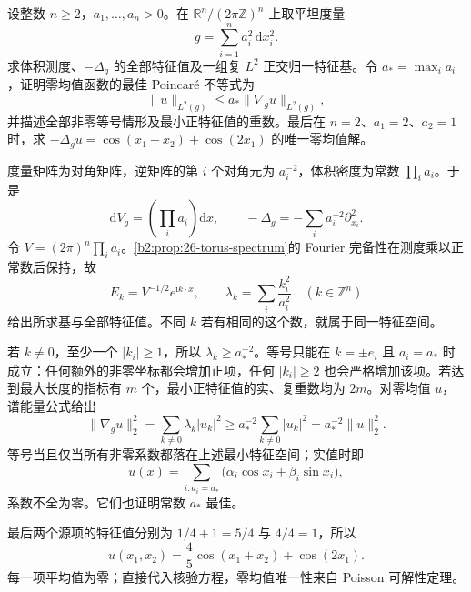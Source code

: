\begin{exercise}\label{b2:ex:26-rectangular-torus}
设整数 \(n\geq2\)，\(a_1,\ldots,a_n>0\)。在 \(\mathbb R^n/(2\pi\mathbb Z)^n\) 上取平坦度量
\[
 g=\sum_{i=1}^n a_i^2\,\mathrm dx_i^2.
\]
求体积测度、\(-\Delta_g\) 的全部特征值及一组复 \(L^2\) 正交归一特征基。令 \(a_*=\max_i a_i\)，证明零均值函数的最佳 Poincaré 不等式为
\[
 \|u\|_{L^2(g)}\leq a_*\|\nabla_g u\|_{L^2(g)},
\]
并描述全部非零等号情形及最小正特征值的重数。最后在 \(n=2\)、\(a_1=2\)、\(a_2=1\) 时，求 \(-\Delta_gu=\cos(x_1+x_2)+\cos(2x_1)\) 的唯一零均值解。
\end{exercise}
\begin{solution}
度量矩阵为对角矩阵，逆矩阵的第 \(i\) 个对角元为 \(a_i^{-2}\)，体积密度为常数 \(\prod_i a_i\)。于是
\[
 \mathrm dV_g=\left(\prod_i a_i\right)\mathrm dx,\qquad
 -\Delta_g=-\sum_i a_i^{-2}\partial_{x_i}^2.
\]
令 \(V=(2\pi)^n\prod_i a_i\)。\cref{b2:prop:26-torus-spectrum}的 Fourier 完备性在测度乘以正常数后保持，故
\[
 E_k=V^{-1/2}e^{\mathrm ik\cdot x},\qquad
 \lambda_k=\sum_i\frac{k_i^2}{a_i^2}\quad(k\in\mathbb Z^n)
\]
给出所求基与全部特征值。不同 \(k\) 若有相同的这个数，就属于同一特征空间。

若 \(k\ne0\)，至少一个 \(|k_i|\geq1\)，所以 \(\lambda_k\geq a_*^{-2}\)。等号只能在 \(k=\pm e_i\) 且 \(a_i=a_*\) 时成立：任何额外的非零坐标都会增加正项，任何 \(|k_i|\geq2\) 也会严格增加该项。若达到最大长度的指标有 \(m\) 个，最小正特征值的实、复重数均为 \(2m\)。对零均值 \(u\)，谱能量公式给出
\[
 \|\nabla_g u\|_2^2=\sum_{k\ne0}\lambda_k|u_k|^2
 \geq a_*^{-2}\sum_{k\ne0}|u_k|^2=a_*^{-2}\|u\|_2^2.
\]
等号当且仅当所有非零系数都落在上述最小特征空间；实值时即
\[
 u(x)=\sum_{i:a_i=a_*}\bigl(\alpha_i\cos x_i+\beta_i\sin x_i\bigr),
\]
系数不全为零。它们也证明常数 \(a_*\) 最佳。

最后两个源项的特征值分别为 \(1/4+1=5/4\) 与 \(4/4=1\)，所以
\[
 u(x_1,x_2)=\frac45\cos(x_1+x_2)+\cos(2x_1).
\]
每一项平均值为零；直接代入核验方程，零均值唯一性来自 Poisson 可解性定理。
\end{solution}

